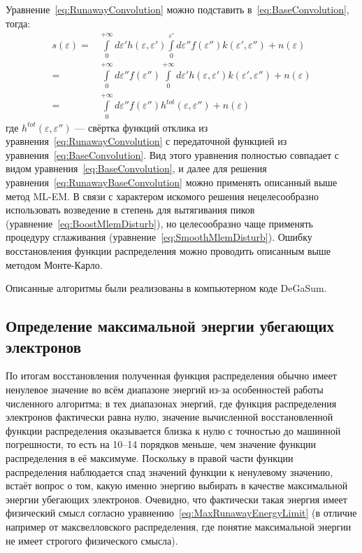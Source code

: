 Уравнение~\ref{eq:RunawayConvolution} можно подставить в~\ref{eq:BaseConvolution}, тогда:
\begin{equation}
  \label{eq:RunawayBaseConvolution}
  \begin{alignedat}{1}
    s( \varepsilon ) = & \int \limits_0^{+\infty} d \varepsilon' h( \varepsilon, \varepsilon' ) \int \limits_0^{\varepsilon'} d \varepsilon'' f( \varepsilon'') k( \varepsilon', \varepsilon'' ) + n(\varepsilon) \\
    = & \int \limits_0^{+\infty} d \varepsilon'' f( \varepsilon'' ) \int \limits_0^{+\infty} d \varepsilon' h( \varepsilon, \varepsilon' ) k( \varepsilon', \varepsilon'' ) + n(\varepsilon) \\ 
    = & \int \limits_0^{+\infty} d \varepsilon'' f( \varepsilon'' ) h^{tot}( \varepsilon, \varepsilon'' ) + n(\varepsilon)
  \end{alignedat}  
\end{equation}
где $h^{tot}( \varepsilon, \varepsilon'' )$ --- свёртка функций отклика из уравнения~\ref{eq:RunawayConvolution} с передаточной функцией из уравнения~\ref{eq:BaseConvolution}. Вид этого уравнения полностью совпадает с видом уравнения~\ref{eq:BaseConvolution}, и далее для решения уравнения~\ref{eq:RunawayBaseConvolution} можно применять описанный выше метод ML-EM. В связи с характером искомого решения нецелесообразно использовать возведение в степень для вытягивания пиков (уравнение~\ref{eq:BoostMlemDisturb}), но целесообразно чаще применять процедуру сглаживания (уравнение~\ref{eq:SmoothMlemDisturb}). Ошибку восстановления функции распределения можно проводить описанным выше методом Монте-Карло.~\cite{Shevelev2013}

Описанные алгоритмы были реализованы в компьютерном коде DeGaSum. 


\subsection{Определение максимальной энергии убегающих электронов}

По итогам восстановления полученная функция распределения обычно имеет ненулевое значение во всём диапазоне энергий из-за особенностей работы численного алгоритма; в тех диапазонах энергий, где функция распределения электронов фактически равна нулю, значение вычисленной восстановленной функции распределения оказывается близка к нулю с точностью до машинной погрешности, то есть на 10--14 порядков меньше, чем значение функции распределения в её максимуме. Поскольку в правой части функции распределения наблюдается спад значений функции к ненулевому значению, встаёт вопрос о том, какую именно энергию выбирать в качестве максимальной энергии убегающих электронов. Очевидно, что фактически такая энергия имеет физический смысл согласно уравнению~\ref{eq:MaxRunawayEnergyLimit} (в отличие например от максвелловского распределения, где понятие максимальной энергии не имеет строгого физического смысла). 

